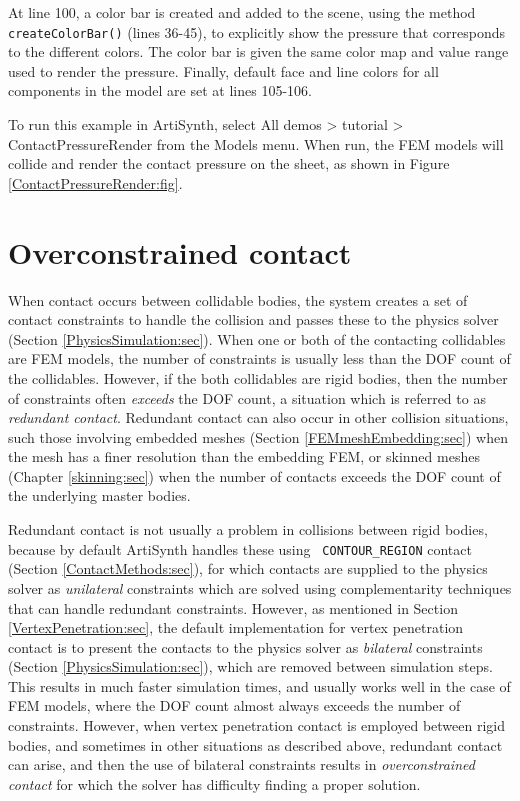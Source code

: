 At line 100, a color bar is created and added to the scene, using the
method {\tt createColorBar()} (lines 36-45), to explicitly show the
pressure that corresponds to the different colors. The color bar is
given the same color map and value range used to render the
pressure. Finally, default face and line colors for all components in
the model are set at lines 105-106.

To run this example in ArtiSynth, select {\sf All demos > tutorial >
ContactPressureRender} from the {\sf Models} menu. When run, the FEM
models will collide and render the contact pressure on the sheet, as
shown in Figure \ref{ContactPressureRender:fig}.

\section{Overconstrained contact}
\label{OverconstrainedContact:sec}

When contact occurs between collidable bodies, the system creates a
set of contact constraints to handle the collision and passes these to
the physics solver (Section \ref{PhysicsSimulation:sec}).  When one or
both of the contacting collidables are FEM models, the number of
constraints is usually less than the DOF count of the collidables.
However, if the both collidables are rigid bodies, then the number of
constraints often {\it exceeds} the DOF count, a situation which is
referred to as {\it redundant contact}. Redundant contact can also
occur in other collision situations, such those involving embedded
meshes (Section \ref{FEMmeshEmbedding:sec}) when the mesh has a finer
resolution than the embedding FEM, or skinned meshes
(Chapter \ref{skinning:sec}) when the number of contacts exceeds the
DOF count of the underlying master bodies.

Redundant contact is not usually a problem in collisions between rigid
bodies, because by default ArtiSynth handles these using {\tt
CONTOUR\_REGION} contact (Section \ref{ContactMethods:sec}), for
which contacts are supplied to the physics solver as {\it unilateral}
constraints which are solved using complementarity techniques
that can handle redundant constraints. However, as mentioned in
Section \ref{VertexPenetration:sec}, the default implementation for
vertex penetration contact is to present the contacts to the
physics solver as {\it bilateral} constraints (Section
\ref{PhysicsSimulation:sec}), which are removed between simulation
steps. This results in much faster simulation times, and usually works
well in the case of FEM models, where the DOF count almost always
exceeds the number of constraints. However, when vertex penetration
contact is employed between rigid bodies, and sometimes in other
situations as described above, redundant contact can arise, and then
the use of bilateral constraints results in {\it overconstrained
contact} for which the solver has difficulty finding a proper
solution.

